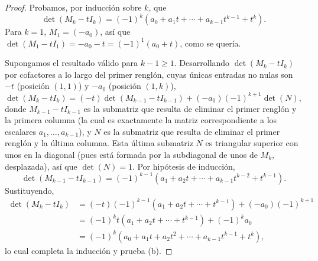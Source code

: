 \documentclass[12pt,a4paper]{book}
\begin{document}
\begin{proof}
        Probamos, por inducción sobre $k$, que
        \begin{equation*}
            \det(M_k-tI_k)=(-1)^k\left(a_0+a_1t+\cdots+a_{k-1}t^{k-1}+t^k\right).
        \end{equation*}
        Para $k=1$, $M_1=(-a_0)$, así que $\det(M_1-tI_1)=-a_0-t=(-1)^1(a_0+t)$, como se quería.

        Supongamos el resultado válido para $k-1\geq 1$. Desarrollando $\det(M_k-tI_k)$ por cofactores a lo largo del primer renglón, cuyas únicas entradas no nulas son $-t$ (posición $(1,1)$) y $-a_0$ (posición $(1,k)$),
        \begin{equation*}
            \det(M_k-tI_k)=(-t)\det(M_{k-1}-tI_{k-1})+(-a_0)(-1)^{k+1}\det(N),
        \end{equation*}
        donde $M_{k-1}-tI_{k-1}$ es la submatriz que resulta de eliminar el primer renglón y la primera columna (la cual es exactamente la matriz correspondiente a los escalares $a_1,\dots,a_{k-1}$), y $N$ es la submatriz que resulta de eliminar el primer renglón y la última columna. Esta última submatriz $N$ es triangular superior con unos en la diagonal (pues está formada por la subdiagonal de unos de $M_k$, desplazada), así que $\det(N)=1$. Por hipótesis de inducción,
        \begin{equation*}
            \det(M_{k-1}-tI_{k-1})=(-1)^{k-1}\left(a_1+a_2t+\cdots+a_{k-1}t^{k-2}+t^{k-1}\right).
        \end{equation*}
        Sustituyendo,
        \begin{align*}
            \det(M_k-tI_k)&=(-t)(-1)^{k-1}\left(a_1+a_2t+\cdots+t^{k-1}\right)+(-a_0)(-1)^{k+1}\\
            &=(-1)^k t\left(a_1+a_2t+\cdots+t^{k-1}\right)+(-1)^k a_0\\
            &=(-1)^k\left(a_0+a_1t+a_2t^2+\cdots+a_{k-1}t^{k-1}+t^k\right),
        \end{align*}
        lo cual completa la inducción y prueba (b).
    \end{proof}
\end{document}
